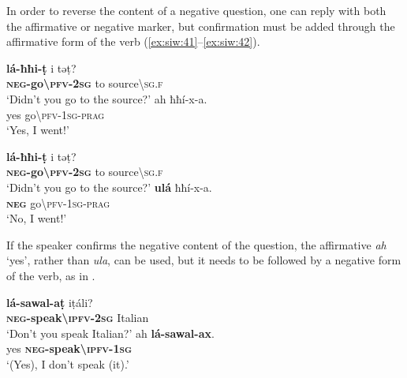 \documentclass[output=paper,colorlinks,citecolor=brown]{langscibook}
\begin{document}
In order to reverse the content of a negative question, one can reply with both the affirmative or negative marker, but confirmation must be added through the affirmative form of the verb (\ref{ex:siw:41}--\ref{ex:siw:42}).

\ea\label{ex:siw:41}
\begin{xlist}[A: ]
        \gll \textbf{l\'{a}-ħħi-ṭ} i təṭ? \\
             \textbf{\textsc{neg}-go{\textbackslash}\textsc{pfv}-\textsc{2sg}} to source{\textbackslash}\textsc{sg.f} \\
        \glt ‘Didn’t you go to the source?’
        \gll ah ħħí-x-a.\\
             yes go{\textbackslash}\textsc{pfv-1sg-prag}\\
        \glt ‘Yes, I went!’
\end{xlist}
\z

\ea\label{ex:siw:42}
\begin{xlist}[A: ]
        \gll \textbf{l\'{a}-ħħi-ṭ} i təṭ? \\
             \textbf{\textsc{neg}-go{\textbackslash}\textsc{pfv}-2\textsc{sg}} to source{\textbackslash}\textsc{sg.f} \\
        \glt ‘Didn’t you go to the source?’
        \gll \textbf{ulá} ħħí-x-a.\\
             \textbf{\textsc{neg}} go{\textbackslash}\textsc{pfv-1sg-prag}\\
        \glt ‘No, I went!’
\end{xlist}
\z

If the speaker confirms the negative content of the question, the affirmative \textit{ah} ‘yes’, rather than \textit{ula}, can be used, but it needs to be followed by a negative form of the verb, as in .

\ea\label{ex:siw:43}
\begin{xlist}[A: ]
        \gll \textbf{lá-sawal-aṭ} iṭáli? \\
             \textbf{\textsc{neg}-speak{\textbackslash}\textsc{ipfv}-\textsc{2sg}} Italian \\
        \glt ‘Don’t you speak Italian?’
        \gll  ah \textbf{lá-sawal-ax}.\\
              yes \textbf{\textsc{neg}-speak{\textbackslash}\textsc{ipfv}-\textsc{1sg}}\\
        \glt ‘(Yes), I don’t speak (it).’
\end{xlist}
\z
\end{document}
